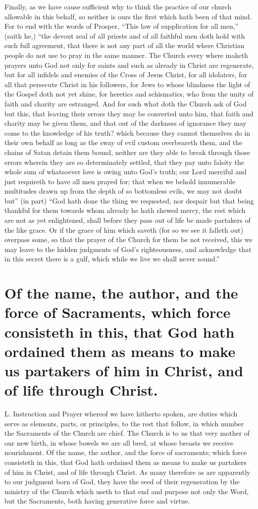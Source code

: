 Finally, as we have cause sufficient why to think the practice of our church allowable in this behalf, so neither is ours the first which hath been of that mind. For to end with the words of Prosper, “This law of supplication for all men,” (saith he,) “the devout zeal of all priests and of all faithful men doth hold with such full agreement, that there is not any part of all the world where Christian people do not use to pray in the same manner. The Church every where maketh prayers unto God not only for saints and such as  already in Christ are regenerate, but for all infidels and enemies of the Cross of Jesus Christ, for all idolaters, for all that persecute Christ in his followers, for Jews to whose blindness the light of the Gospel doth not yet shine, for heretics and schismatics, who from the unity of faith and charity are estranged. And for such what doth the Church ask of God but this, that leaving their errors they may be converted unto him, that faith and charity may be given them, and that out of the darkness of ignorance they may come to the knowledge of his truth? which because they cannot themselves do in their own behalf as long as the sway of evil custom overbeareth them, and the chains of Satan detain them bound, neither are they able to break through those errors wherein they are so determinately settled, that they pay unto falsity the whole sum of whatsoever love is owing unto God’s truth; our Lord merciful and just requireth to have all men prayed for; that when we behold innumerable multitudes drawn up from the depth of so bottomless evils, we may not doubt but” (in part) “God hath done the thing we requested, nor despair but that being thankful for them towards whom already he hath shewed mercy, the rest which are not as yet enlightened, shall before they pass out of life be made partakers of the like grace. Or if the grace of him which saveth (for so we see it falleth out) overpass some, so that the prayer of the Church for them be not received, this we may leave to the hidden judgments of God’s righteousness, and acknowledge that in this secret there is a gulf, which while we live we shall never sound.”

\section*{Of the name, the author, and the force of Sacraments, which force consisteth in this, that God hath ordained them as means to make us partakers of him in Christ, and of life through Christ.}
L. Instruction and Prayer whereof we have hitherto spoken, are duties which serve as elements, parts, or principles, to the rest that follow, in which number the Sacraments of the Church are chief. The Church is to us that very mother of our new birth, in whose bowels we are all bred, at whose breasts we receive nourishment.
Of the name, the author, and the force of sacraments; which force consisteth in this, that God hath ordained them as means to make us partakers of him in Christ, and of life through Christ.
 As many therefore as are apparently to our judgment born of God, they have the seed of their regeneration by the ministry of the Church which useth to that end and purpose not only the Word, but the Sacraments, both having generative force and virtue.

